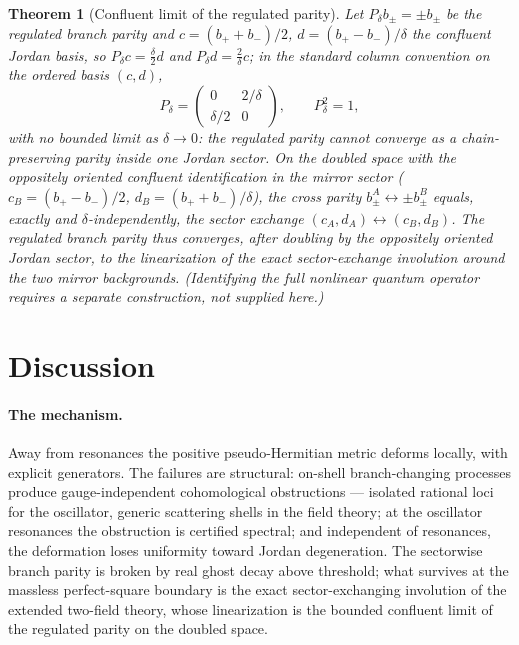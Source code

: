 \documentclass[11pt]{article}
\newtheorem{theorem}{Theorem}[section]
\theoremstyle{definition}
\theoremstyle{remark}
\begin{document}
\begin{theorem}[Confluent limit of the regulated parity]
\label{thm:confluent}
Let $P_\delta b_\pm=\pm b_\pm$ be the regulated branch parity and
$c=(b_++b_-)/2$, $d=(b_+-b_-)/\delta$ the confluent Jordan basis, so
$P_\delta c=\tfrac\delta2 d$ and $P_\delta d=\tfrac2\delta c$; in the
standard column convention on the ordered basis $(c,d)$,
\begin{equation}
P_\delta=
\begin{pmatrix}0&2/\delta\\ \delta/2&0\end{pmatrix},
\qquad P_\delta^2=1,
\end{equation}
with no bounded limit as $\delta\to0$: the regulated parity cannot
converge as a chain-preserving parity inside one Jordan sector.  On the
doubled space with the \emph{oppositely oriented} confluent
identification in the mirror sector ($c_B=(b_+-b_-)/2$,
$d_B=(b_++b_-)/\delta$), the cross parity
$b_\pm^A\leftrightarrow\pm b_\pm^B$ equals, exactly and
$\delta$-independently, the sector exchange
$(c_A,d_A)\leftrightarrow(c_B,d_B)$.  The regulated branch parity thus
converges, after doubling by the oppositely oriented Jordan sector, to
\emph{the linearization of the exact sector-exchange involution around
the two mirror backgrounds}.  (Identifying the full nonlinear quantum
operator requires a separate construction, not supplied here.)
\end{theorem}

\section{Discussion}\label{sec:discussion}

\paragraph{The mechanism.}
Away from resonances the positive pseudo-Hermitian metric deforms
locally, with explicit generators.  The failures are structural:
on-shell branch-changing processes produce gauge-independent
cohomological obstructions --- isolated rational loci for the
oscillator, generic scattering shells in the field theory; at the
oscillator resonances the obstruction is certified spectral; and
independent of resonances, the deformation loses uniformity toward
Jordan degeneration.  The sectorwise branch parity is broken by real
ghost decay above threshold; what survives at the massless
perfect-square boundary is the exact sector-exchanging involution of
the extended two-field theory, whose linearization is the bounded
confluent limit of the regulated parity on the doubled space.
\end{document}
